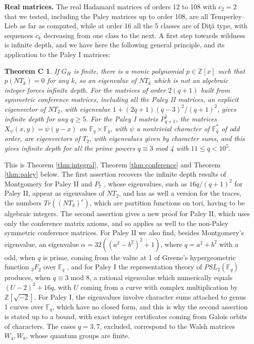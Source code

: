 \documentclass[11pt]{amsart}
\newtheorem*{thmC}{Theorem C}
\begin{document}
\medskip

\noindent\textbf{Real matrices.} The real Hadamard matrices of orders 12 to 108 with $c_2=2$ that we tested, including the Paley matrices up to order 108, are all Temperley--Lieb as far as computed, while at order 16 all the 5 classes are of Di\c t\u a type, with sequences $c_k$ decreasing from one class to the next. A first step towards wildness is infinite depth, and we have here the following general principle, and its application to the Paley I matrices:

\begin{thmC}
If $G_H$ is finite, there is a monic polynomial $p\in\mathbb Z[x]$ such that $p(NT_k)=0$ for any $k$, so an eigenvalue of $NT_k$ which is not an algebraic integer forces infinite depth. For the matrices of order $2(q+1)$ built from symmetric conference matrices, including all the Paley II matrices, an explicit eigenvector of $NT_2$, with eigenvalue $1+(2q+1)(q-3)^2/(q+1)^2$, gives infinite depth for any $q\geq5$. For the Paley I matrix $P^1_{q+1}$, the matrices $X_\psi(x,y)=\psi(y-x)$ on $\mathbb F_q\times\mathbb F_q$, with $\psi$ a nontrivial character of $\mathbb F_q^*$ of odd order, are eigenvectors of $T_2$, with eigenvalues given by character sums, and this gives infinite depth for all the prime powers $q\equiv3$ mod 4 with $11\leq q<10^5$.
\end{thmC}

This is Theorem \ref{thm:integral}, Theorem \ref{thm:conference} and Theorem \ref{thm:paley} below. The first assertion recovers the infinite depth results of Montgomery for Paley II and $P_7$ \cite{mo2,mo3}, whose eigenvalues, such as $16q/(q+1)^2$ for Paley II, appear as eigenvalues of $NT_2$, and has as well a version for the traces, the numbers $Tr((NT_k)^r)$, which are partition functions on tori, having to be algebraic integers. The second assertion gives a new proof for Paley II, which uses only the conference matrix axioms, and so applies as well to the non-Paley symmetric conference matrices. For Paley II we also find, besides Montgomery's eigenvalue, an eigenvalue $\alpha=32((a^2-b^2)^2+1)$, where $q=a^2+b^2$ with $a$ odd, when $q$ is prime, coming from the value at 1 of Greene's hypergeometric function ${}_3F_2$ over $\mathbb F_q$ \cite{gre,ono}, and for Paley I the representation theory of $PSL_2(\mathbb F_q)$ produces, when $q\equiv3$ mod 8, a rational eigenvalue which numerically equals $(U-2)^2+16q$, with $U$ coming from a curve with complex multiplication by $\mathbb Z[\sqrt{-2}]$. For Paley I, the eigenvalues involve character sums attached to genus 1 curves over $\mathbb F_q$, which have no closed form, and this is why the second assertion is stated up to a bound, with exact integer certificates coming from Galois orbits of characters. The cases $q=3,7$, excluded, correspond to the Walsh matrices $W_4,W_8$, whose quantum groups are finite.
\end{document}
